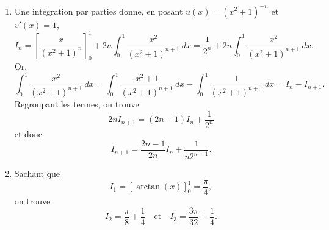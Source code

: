 \begin{enumerate}
\item Une intégration par parties donne, en posant $u(x)=(x^2+1)^{-n}$ et $v'(x)=1$, \[ I_n = \left[ \frac{x}{(x^2+1)^n} \right]_0^1 +2n \int_0^1 \frac{x^2}{(x^2+1)^{n+1}} \, dx
= \frac{1}{2^n}+2n \int_0^1  \frac{x^2}{(x^2+1)^{n+1}} \,dx.\]
Or, \[ \int_0^1  \frac{x^2}{(x^2+1)^{n+1}} \,dx = \int_0^1  \frac{x^2 +1}{(x^2+1)^{n+1}} \,dx  - 
\int_0^1  \frac{1}{(x^2+1)^{n+1}} \,dx = I_n - I_{n+1}.\]
Regroupant les termes, on trouve
\[ 2n I_{n+1} =(2n - 1)I_n + \frac{1}{2^n}\]
et donc
\[ I_{n+1} = \frac{2n-1}{2n} I_n + \frac{1}{n2^{n+1}}.\]
\item Sachant que
\[ I_1= [\arctan(x)]_0^1 = \frac{\pi}{4},\]
on trouve 
\[ I_2=\frac{\pi}{8} + \frac{1}{4} \quad \text{et} \quad I_3= \frac{3 \pi}{32} + \frac{1}{4}.\]
\end{enumerate}